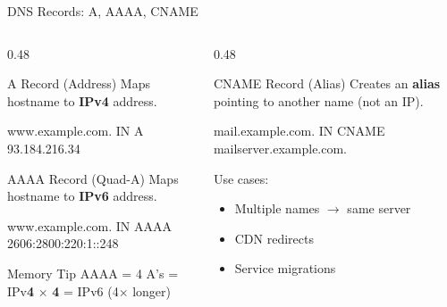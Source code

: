 \documentclass[aspectratio=169]{beamer}  %
\begin{document}
\begin{frame}{DNS Records: A, AAAA, CNAME}
    \begin{columns}[T]
        \begin{column}{0.48\textwidth}
            \begin{block}{A Record (Address)}
                \small
                Maps hostname to \textbf{IPv4} address.
                
                \vspace{0.2em}
                \ttfamily\footnotesize
                www.example.com. IN A 93.184.216.34
            \end{block}
            
            \vspace{0.2em}
            \begin{block}{AAAA Record (Quad-A)}
                \small
                Maps hostname to \textbf{IPv6} address.
                
                \vspace{0.2em}
                \ttfamily\footnotesize
                www.example.com. IN AAAA 2606:2800:220:1::248
            \end{block}
            
            \vspace{0.2em}
            \begin{alertblock}{Memory Tip}
                \small
                AAAA = 4 A's = IPv\textbf{4} × \textbf{4} = IPv6 (4× longer)
            \end{alertblock}
        \end{column}
        \begin{column}{0.48\textwidth}
            \begin{block}{CNAME Record (Alias)}
                \small
                Creates an \textbf{alias} pointing to another name (not an IP).
                
                \vspace{0.2em}
                \ttfamily\footnotesize
                mail.example.com. IN CNAME \\
                \hspace{1em}mailserver.example.com.
                
                \vspace{0.3em}
                \normalfont\small
                Use cases:
                \begin{itemize}\setlength{\itemsep}{1pt}
                    \item Multiple names $\rightarrow$ same server
                    \item CDN redirects
                    \item Service migrations
                \end{itemize}
            \end{block}
            

\end{column}
\end{columns}
\end{frame}
\end{document}
